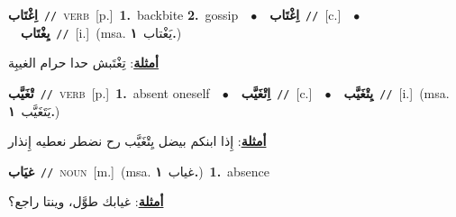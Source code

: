 \documentclass[10pt,a4paper,twoside]{article} %
\begin{document}
\begin{multicols}{2}
{\setlength\topsep{0pt}\textbf{\foreignlanguage{arabic}{اِغْتَاب}}\ {\color{gray}\texttt{//}\color{black}}\ \textsc{verb}\ [p.]\ \textbf{1.}~backbite  \textbf{2.}~gossip\ \ $\bullet$\ \ \setlength\topsep{0pt}\textbf{\foreignlanguage{arabic}{اِغْتَاب}}\ {\color{gray}\texttt{//}\color{black}}\ [c.]\ \ $\bullet$\ \ \setlength\topsep{0pt}\textbf{\foreignlanguage{arabic}{يِغْتَاب}}\ {\color{gray}\texttt{//}\color{black}}\ [i.]\ \color{gray}(msa. \foreignlanguage{arabic}{يَغْتاب}~\foreignlanguage{arabic}{\textbf{١.}})\color{black}\  \begin{flushright}\color{gray}\foreignlanguage{arabic}{\textbf{\underline{\foreignlanguage{arabic}{أمثلة}}}: تِغْتَبش حدا حرام الغيبِة}\end{flushright}\color{black}} \vspace{2mm}

{\setlength\topsep{0pt}\textbf{\foreignlanguage{arabic}{تْغَيَّب}}\ {\color{gray}\texttt{//}\color{black}}\ \textsc{verb}\ [p.]\ \textbf{1.}~absent oneself\ \ $\bullet$\ \ \setlength\topsep{0pt}\textbf{\foreignlanguage{arabic}{اِتْغَيَّب}}\ {\color{gray}\texttt{//}\color{black}}\ [c.]\ \ $\bullet$\ \ \setlength\topsep{0pt}\textbf{\foreignlanguage{arabic}{يِتْغَيَّب}}\ {\color{gray}\texttt{//}\color{black}}\ [i.]\ \color{gray}(msa. \foreignlanguage{arabic}{يَتَغَيَّب}~\foreignlanguage{arabic}{\textbf{١.}})\color{black}\  \begin{flushright}\color{gray}\foreignlanguage{arabic}{\textbf{\underline{\foreignlanguage{arabic}{أمثلة}}}: إِذا ابنكم بيضل يِتْغَيَّب رح نضطر نعطيه إِنذار}\end{flushright}\color{black}} \vspace{2mm}

{\setlength\topsep{0pt}\textbf{\foreignlanguage{arabic}{غيَاب}}\ {\color{gray}\texttt{//}\color{black}}\ \textsc{noun}\ [m.]\ \color{gray}(msa. \foreignlanguage{arabic}{غياب}~\foreignlanguage{arabic}{\textbf{١.}})\color{black}\ \textbf{1.}~absence\  \begin{flushright}\color{gray}\foreignlanguage{arabic}{\textbf{\underline{\foreignlanguage{arabic}{أمثلة}}}: غيابك طوَّل، وينتا راجع؟}\end{flushright}\color{black}} \vspace{2mm}


\end{multicols}
\end{document}
